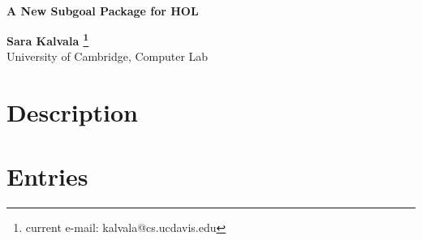 






\begin{titlepage}

\ 
\vskip 3in

{\Huge \bf A New Subgoal Package for HOL}

\begin{flushright}
{\Large {\bf Sara Kalvala \footnote{current e-mail: kalvala@cs.ucdavis.edu}} \\
University of Cambridge, Computer Lab}

\end{flushright}

\end{titlepage}

\thispagestyle{empty}
\mbox{}

\newpage

\tableofcontents

   \setcounter{page}{1}		         %

\chapter{ Description}



\chapter{Entries}




